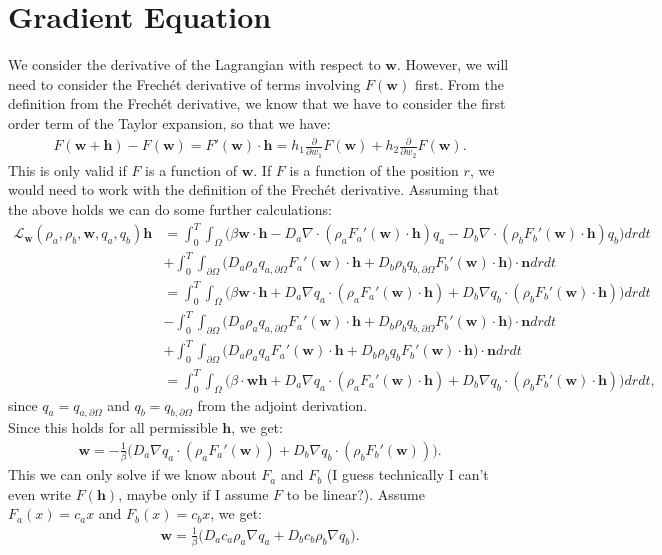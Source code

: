 \documentclass[11pt, a4paper]{article}
\theoremstyle{definition}
\newcommand{\adja}{q_a}
\newcommand{\adjb}{q_b}
\newcommand{\adjaB}{q_{a,\partial \Omega}}
\newcommand{\adjbB}{q_{b,\partial \Omega}}
\newcommand{\ra}{\rho_a}
\newcommand{\rb}{\rho_b}
\newcommand{\w}{\mathbf{w}}
\newcommand{\n}{\mathbf{n}}
\newcommand{\h}{\mathbf{h}}
\begin{document}
	\section{Gradient Equation}
	We consider the derivative of the Lagrangian with respect to $\w$. However, we will need to consider the Frech\'et derivative of terms involving $F(\w)$ first.
	From the definition from the Frech\'et derivative, we know that we have to consider the first order term of the Taylor expansion, so that we have:
	\begin{align*}
	F(\w + \h) - F(\w) =  F'(\w)\cdot \h = h_1 \frac{\partial}{\partial w_1} F(\w)  + h_2\frac{\partial}{\partial w_2} F(\w) . 
	\end{align*}
    This is only valid if $F$ is a function of $\w$. If $F$ is a function of the position $r$, we would need to work with the definition of the Frech\'et derivative. 
    Assuming that the above holds we can do some further calculations:
	\begin{align*}
	\mathcal{L}_{\w}(\ra,\rb, \w, \adja, \adjb) \h  &= \int_0^T \int_\Omega \bigg( \beta \w \cdot \h - D_a \nabla \cdot (\ra F_a'(\w)\cdot \h)  \adja - D_b \nabla \cdot (\rb F_b'(\w) \cdot \h) \adjb \bigg)dr dt \\
	&+ \int_0^T \int_{\partial \Omega} \bigg( D_a \ra \adjaB F_a'(\w)\cdot \h  + D_b \rb \adjbB F_b'(\w)\cdot \h     \bigg) \cdot \n dr dt\\
	&= \int_0^T \int_\Omega \bigg( \beta \w \cdot \h + D_a \nabla  \adja \cdot (\ra F_a'(\w)\cdot \h) 
	+ D_b \nabla \adjb \cdot (\rb F_b'(\w)\cdot \h) \bigg)dr dt \\
	&- \int_0^T \int_{\partial \Omega} \bigg( D_a \ra \adjaB F_a'(\w)\cdot \h  + D_b \rb \adjbB F_b'(\w)\cdot \h     \bigg) \cdot \n dr dt\\
	&+\int_0^T \int_{\partial \Omega} \bigg( D_a \ra \adja F_a'(\w)\cdot \h  + D_b \rb \adjb F_b'(\w)\cdot \h     \bigg) \cdot \n dr dt\\
	&= \int_0^T \int_\Omega \bigg( \beta \cdot \w \h + D_a \nabla  \adja \cdot (\ra F_a'(\w)\cdot \h) 
	+ D_b \nabla \adjb \cdot (\rb F_b'(\w)\cdot \h) \bigg)dr dt,
	\end{align*}
	since $\adja = \adjaB$ and $\adjb = \adjbB$ from the adjoint derivation.\\
	Since this holds for all permissible $\h$, we get:
	\begin{align*}
	\w  = - \frac{1}{\beta} \bigg( D_a \nabla  \adja \cdot (\ra F_a'(\w)) 
	+ D_b \nabla \adjb \cdot (\rb F_b'(\w)) \bigg).
	\end{align*} 
	This we can only solve if we know about $F_a$ and $F_b$ (I guess technically I can't even write $F(\h)$, maybe only if I assume $F$ to be linear?). Assume $F_a(x) = c_a x$ and $F_b(x) = c_b x$, we get:
	\begin{align*}
	\w  = \frac{1}{\beta}\bigg( D_a c_a  \ra  \nabla \adja + D_b c_b \rb \nabla \adjb \bigg).
	\end{align*}

	
\end{document}
